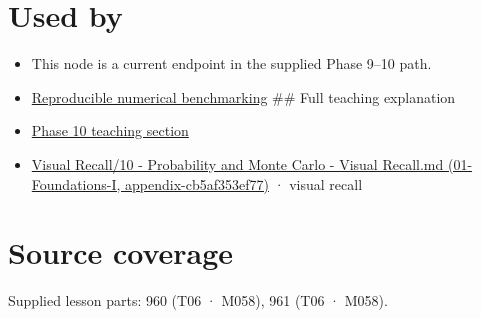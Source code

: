 \section{Used by}\label{appendix-c83016554b1e-used-by}

\begin{itemize}
\item
  This node is a current endpoint in the supplied Phase 9--10 path.
\item
  \hyperref[appendix-b9db93e28371]{Reproducible numerical benchmarking} \#\# Full teaching explanation
\item
  \href{Continuous\%20Notes/Computing\%20Foundations\%20-\%20From\%20Bits\%20to\%20C++\%20and\%20Systems\%20APIs\#10.\%20Inference\%20and\%20error\%20metrics\%20need\%20explicit\%20assumptions}{Phase 10 teaching section}
\item
  \href{../01-Foundations-I/main.pdf\#nameddest=appendix-cb5af353ef77}{Visual Recall/10 - Probability and Monte Carlo - Visual Recall.md (01-Foundations-I, appendix-cb5af353ef77)} · visual recall
\end{itemize}

\section{Source coverage}\label{appendix-c83016554b1e-source-coverage}

Supplied lesson parts: 960 (T06 · M058), 961 (T06 · M058).
